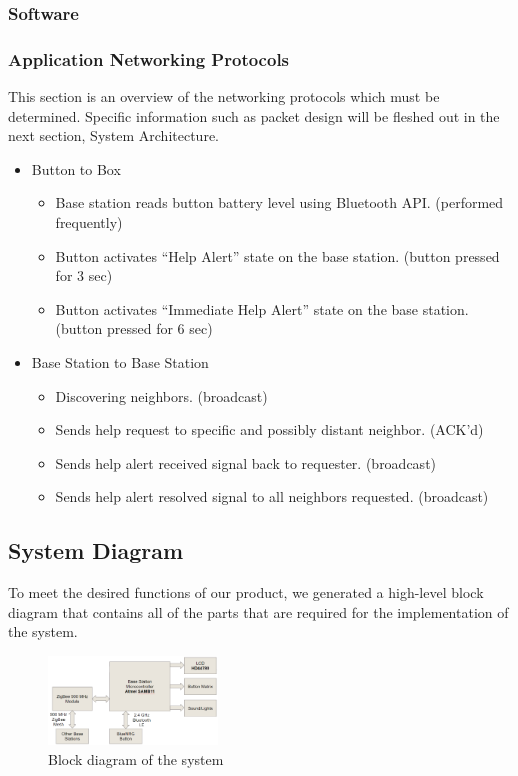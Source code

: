 \documentclass[journal,compsoc]{IEEEtran}
\begin{document}
\subsubsection{Software}

\subsubsection{Application Networking Protocols}

This section is an overview of the networking protocols which must be determined.  Specific information such as packet design will be fleshed out in the next section, System Architecture.

\begin{itemize}
  \item Button to Box
    \begin{itemize}
      \item Base station reads button battery level using Bluetooth API. (performed frequently)
      \item Button activates “Help Alert” state on the base station. (button pressed for 3 sec)
      \item Button activates “Immediate Help Alert” state on the base station. (button pressed for 6 sec)
    \end{itemize}
  \item Base Station to Base Station
    \begin{itemize}
      \item Discovering neighbors. (broadcast)
      \item Sends help request to specific and possibly distant neighbor. (ACK’d)
      \item Sends help alert received signal back to requester. (broadcast)
      \item Sends help alert resolved signal to all neighbors requested. (broadcast)
    \end{itemize}
\end{itemize}

\subsection{System Diagram}

To meet the desired functions of our product, we generated a high-level block diagram that contains all of the parts that are required for the implementation of the system.

\begin{figure}[ht] 	%
\centering
\includegraphics[width=0.4\textwidth]{system_diagram.png}
\caption{Block diagram of the system}
\label{Ha-Ha System Diagram}
\end{figure}
\end{document}
